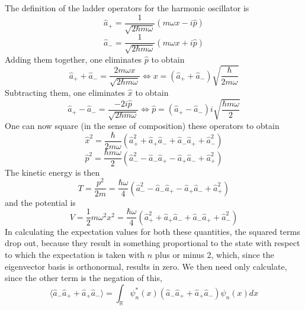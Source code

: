 \documentclass{article}
\begin{document}
\section{}
The definition of the ladder operators for the harmonic oscillator is
\[
  \hat{a}_{+}=\frac{1}{\sqrt{2\hbar m\omega}}\left( m\omega x-i\hat{p} \right)
\]
\[
  \hat{a}_{-}=\frac{1}{\sqrt{2\hbar m\omega}}\left( m\omega x+i\hat{p} \right)
\]
Adding them together, one eliminates $\hat{p}$ to obtain
\[
  \hat{a}_{+}+\hat{a}_{-}=\frac{2m\omega x}{\sqrt{2\hbar m\omega}}
  \Leftrightarrow x=(\hat{a}_{+}+\hat{a}_{-})\sqrt{\frac{\hbar}{2m\omega}}
\]
Subtracting them, one eliminates $\hat{x}$ to obtain
\[
  \hat{a}_{+}-\hat{a}_{-}=\frac{-2i\hat{p}}{\sqrt{2\hbar m\omega}}
  \Leftrightarrow \hat{p}=(\hat{a}_{+}-\hat{a}_{-})i\sqrt{\frac{\hbar m\omega}{2}}
\]
One can now square (in the sense of composition) these operators to obtain
\[
  \hat{x}^{2}=\frac{\hbar}{2m\omega}(\hat{a}_{+}^{2}+\hat{a}_{+}\hat{a}_{-}+\hat{a}_{-}\hat{a}_{+}+\hat{a}_{-}^{2})
\]
\[
  \hat{p}^{2}=\frac{\hbar m\omega}{2}(\hat{a}_{-}^{2}-\hat{a}_{-}\hat{a}_{+}-\hat{a}_{+}\hat{a}_{-}+\hat{a}_{+}^{2})
\]
The kinetic energy is then
\[
 {T}=\frac{p^{2}}{2m}=\frac{\hbar\omega}{4}(\hat{a}_{-}^{2}-\hat{a}_{-}\hat{a}_{+}-\hat{a}_{+}\hat{a}_{-}+\hat{a}_{+}^{2})
\]
and the potential is
\[V=\frac{1}{2}m\omega^{2}x^{2}=\frac{\hbar\omega}{4}(\hat{a}_{+}^{2}+\hat{a}_{+}\hat{a}_{-}+\hat{a}_{-}\hat{a}_{+}+\hat{a}_{-}^{2})\]
In calculating the expectation values for both these quantities, the squared terms drop out, because they result in something proportional to the state with respect to which the expectation is taken with $n$ plus or minus 2, which, since the eigenvector basis is orthonormal, results in zero.
We then need only calculate, since the other term is the negation of this,
\[\langle \hat{a}_{-}\hat{a}_{+}+\hat{a}_{+}\hat{a}_{-} \rangle=\int_{\mathbb{R}}\psi_{n}^{*}(x)(\hat{a}_{-}\hat{a}_{+}+\hat{a}_{+}\hat{a}_{-})\psi_{n}(x)dx\]
\end{document}
